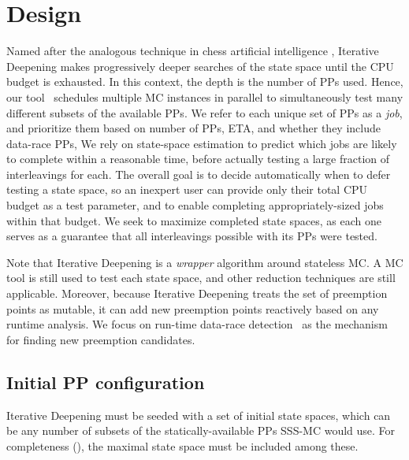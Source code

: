 \section{Design}
\label{sec:design}

Named after the analogous technique in chess artificial intelligence \cite{iterative-deepening-chess-ai},
Iterative Deepening
makes progressively deeper searches of the state space until the CPU budget is exhausted.
In this context, the depth is the number of PPs used.
Hence, our tool \quicksand~schedules multiple MC instances in parallel to simultaneously test many different subsets of the available PPs.
We refer to each unique set of PPs as a {\em job},
and prioritize them based on number of PPs, ETA, and whether they include data-race PPs,
We rely on state-space estimation \cite{estimation}
to predict which jobs are likely to complete within a reasonable time,
before actually testing a large fraction of interleavings for each.
The overall goal is to decide automatically when to defer testing a state space,
so an inexpert user can provide only their total CPU budget as a test parameter,
and to enable completing appropriately-sized jobs within that budget.
We seek to maximize completed state spaces,
as each one serves as a guarantee that all interleavings possible with its PPs were tested.

Note that Iterative Deepening is a {\em wrapper} algorithm around stateless MC.
A MC tool is still used to test each state space, and other reduction techniques are still applicable.
Moreover, because Iterative Deepening treats the set of preemption points as mutable,
it can add new preemption points reactively based on any runtime analysis.
We focus on run-time data-race detection~\cite{hybriddatarace,tsan,ifrit} as the mechanism for finding new preemption candidates.


\subsection{Initial PP configuration}
\label{sec:initial-pp}

Iterative Deepening must be seeded with a set of initial state spaces,
which can be any number of subsets of the statically-available PPs SSS-MC would use.
For completeness (\sect{\ref{sec:totalverif}}), the maximal state space must be included among these.

